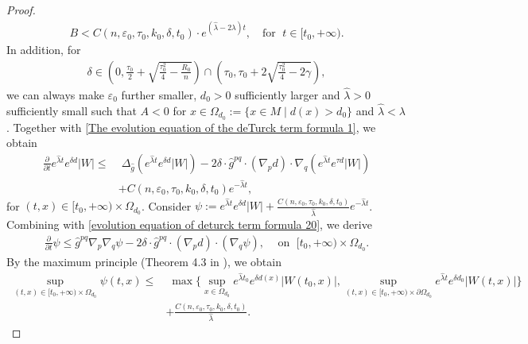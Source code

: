 \documentclass[12pt]{amsart}
\begin{document}
\begin{proof}
\begin{align}
    B < C(n,\varepsilon_0,\tau_0, k_0, \delta, t_0)\cdot e^{(\hat{\lambda} - 2\lambda)t}, \quad \text{for }\; t\in [t_0, +\infty).
\end{align}
In addition, for
\begin{align*}
    \delta \in \left(0, \frac{\tau_0}{2} + \sqrt{\frac{\tau_0^2}{4} - \frac{R_0}{n}} \right) \cap \left(\tau_0, \tau_0 + 2\sqrt{\frac{\tau_0^2}{4} - 2\gamma} \right),
\end{align*}
we can always make $\varepsilon_0$ further smaller, $d_0 > 0$ sufficiently larger and $\hat{\lambda} > 0$ sufficiently small such that $A < 0$ for $x \in \Omega_{d_0} := \{x\in M\; | \; d(x) > d_0\}$ and $ \hat{\lambda} < \lambda$. Together with \eqref{The evolution equation of the deTurck term formula 1}, we obtain 
\begin{equation}\label{evolution equation of deturck term formula 20}
    \begin{split}
        \frac{\partial}{\partial t } e^{\hat{\lambda} t} e^{\delta d}|W| \leq&\; \Delta_{\hat{g}} \left( e^{\hat{\lambda} t}e^{\delta d}|W| \right) - 2\delta \cdot \hat{g}^{pq}\cdot (\nabla_p d) \cdot \nabla_q \left( e^{\hat{\lambda} t}e^{\tau d}|W| \right)\\
        &+  C(n,\varepsilon_0,\tau_0, k_0, \delta, t_0) e^{ - \hat{\lambda} t}, 
    \end{split}
\end{equation}
for $(t, x)\in [t_0, +\infty) \times \Omega_{d_0}$. Consider $\psi := e^{\hat{\lambda} t} e^{\delta d} |W| + \frac{ C(n,\varepsilon_0,\tau_0, k_0, \delta, t_0)}{\hat{\lambda}} e^{ - \hat{\lambda} t}$. Combining with \eqref{evolution equation of deturck term formula 20}, we derive
\begin{align}
    \frac{\partial}{\partial t} \psi \leq \hat{g}^{pq} \nabla_p \nabla_q \psi - 2\delta \cdot \hat{g}^{pq}\cdot (\nabla_p d)\cdot (\nabla_q \psi),\;\;\; \text{ on }\; [t_0, +\infty)\times \Omega_{d_0}.
\end{align}
By the maximum principle (Theorem 4.3 in \cite{QSW2013}), we obtain 
\begin{equation}\label{deTurck term estimate 1}
    \begin{split}
        \sup_{(t, x)\in [t_0, +\infty)\times \Omega_{d_0}} \psi(t, x) \leq&\; \max\Big\{\sup_{x\in \Omega_{d_0}} e^{\hat{\lambda} t_0 } e^{\delta d(x)}|W(t_0, x)|, \sup_{(t, x)\in [t_0, +\infty)\times \partial \Omega_{d_0}} e^{\hat{\lambda} t} e^{\delta d_0} |W(t,x)|\Big\}\\
        & + \frac{C(n, \varepsilon_0, \tau_0, k_0, \delta, t_0)}{\hat{\lambda}}.

\end{split}
\end{equation}
\end{proof}
\end{document}
